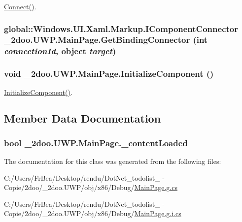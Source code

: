 \hyperlink{class__2doo_1_1_u_w_p_1_1_main_page_19b5e48caf65309421bc1b6f9f0cff39}{Connect()}. 

\hypertarget{class__2doo_1_1_u_w_p_1_1_main_page_99e782bd3eb749c808aba886da1488a4}{
\subsubsection[{GetBindingConnector}]{\setlength{\rightskip}{0pt plus 5cm}global::Windows.UI.Xaml.Markup.IComponentConnector \_\-2doo.UWP.MainPage.GetBindingConnector (int {\em connectionId}, \/  object {\em target})}}
\label{class__2doo_1_1_u_w_p_1_1_main_page_99e782bd3eb749c808aba886da1488a4}


\hypertarget{class__2doo_1_1_u_w_p_1_1_main_page_98a190ba4dbbecc8f3d723b2c50608f0}{
\subsubsection[{InitializeComponent}]{\setlength{\rightskip}{0pt plus 5cm}void \_\-2doo.UWP.MainPage.InitializeComponent ()}}
\label{class__2doo_1_1_u_w_p_1_1_main_page_98a190ba4dbbecc8f3d723b2c50608f0}


\hyperlink{class__2doo_1_1_u_w_p_1_1_main_page_98a190ba4dbbecc8f3d723b2c50608f0}{InitializeComponent()}. 



\subsection{Member Data Documentation}
\hypertarget{class__2doo_1_1_u_w_p_1_1_main_page_78bcf08558e11c9266da0f63a9439665}{
\subsubsection[{\_\-contentLoaded}]{\setlength{\rightskip}{0pt plus 5cm}bool {\bf \_\-2doo.UWP.MainPage.\_\-contentLoaded}}}
\label{class__2doo_1_1_u_w_p_1_1_main_page_78bcf08558e11c9266da0f63a9439665}




The documentation for this class was generated from the following files:\begin{CompactItemize}
\item 
C:/Users/FrBea/Desktop/rendu/DotNet\_\-todolist\_ - Copie/2doo/\_\-2doo.UWP/obj/x86/Debug/\hyperlink{_main_page_8g_8cs}{MainPage.g.cs}\item 
C:/Users/FrBea/Desktop/rendu/DotNet\_\-todolist\_ - Copie/2doo/\_\-2doo.UWP/obj/x86/Debug/\hyperlink{_main_page_8g_8i_8cs}{MainPage.g.i.cs}\end{CompactItemize}

